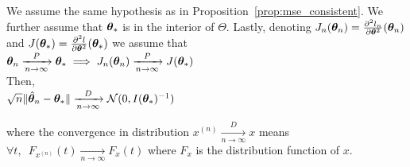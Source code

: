 \begin{proposition}
  \label{prop:asymp:norm}
  We assume the same hypothesis as in Proposition~\ref{prop:mse_consistent}.
  We further assume that $\thetab_*$ is in the interior of $\Theta$.
  Lastly, denoting $J_n(\thetab_n) =
  \partialfrac{\thetab^2}{^2l_n}(\thetab_n)$ and $J(\thetab_*) =
  \partialfrac{\thetab^2}{^2l}(\thetab_*)$ we assume that \\
  $\thetab_n \xrightarrow[n \rightarrow
  \infty]{P} \thetab_* \implies J_n(\thetab_n) \xrightarrow[n \rightarrow
  \infty]{P} J(\thetab_*)$\\
  Then, \\
  $\sqrt{n} \| \hat{\thetab}_n - \thetab_* \| \xrightarrow[n \rightarrow
  \infty]{D}  \Ncal(0,
  I(\thetab_*)^{-1})$
\end{proposition}
where the convergence in distribution $ x^{(n)} \xrightarrow[n \rightarrow \infty]{D} x$ means  $\forall t, \enspace F_{x^{(n)}}(t)
\xrightarrow[n \rightarrow \infty]{} F_x(t)$ where $F_x$ is the distribution
function of $x$.
